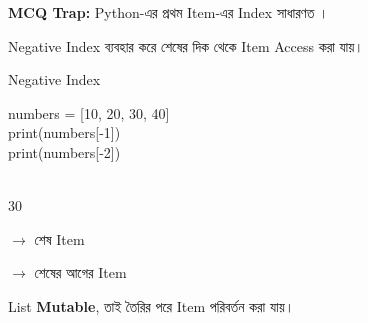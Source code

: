 \begin{rememberbox}

\textbf{\color{deepOrange}MCQ Trap:}
Python-এর প্রথম Item-এর Index সাধারণত
\textenglish{}।

\end{rememberbox}



Negative Index ব্যবহার করে শেষের দিক থেকে Item Access করা যায়।

\begin{codeoutputbox}{Negative Index}

\noindent
\begin{minipage}[t]{0.53\linewidth}
\codeheading

\begin{english}
\ttfamily
numbers = [10, 20, 30, 40]\\
print(numbers[-1])\\
print(numbers[-2])
\end{english}

\end{minipage}
\hfill
\begin{minipage}[t]{0.43\linewidth}
\outputheading

\begin{english}
\\
30
\end{english}

\medskip

\textenglish{}
\(\longrightarrow\)
শেষ Item

\textenglish{}
\(\longrightarrow\)
শেষের আগের Item

\end{minipage}

\end{codeoutputbox}



List \textbf{Mutable}, তাই তৈরির পরে Item পরিবর্তন করা যায়।

